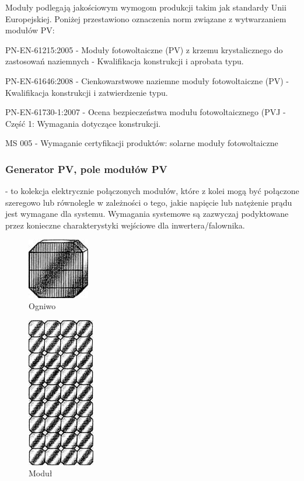 \documentclass[12pt,a4paper]{article}
\begin{document}
Moduły podlegają jakościowym wymogom produkcji takim jak standardy Unii 
Europejskiej. Poniżej przestawiono oznaczenia norm związane z wytwarzaniem modułów PV:  

PN-EN-61215:2005 - Moduły fotowoltaiczne (PV) z krzemu krystalicznego do 
zastosowań naziemnych - Kwalifikacja konstrukcji i aprobata typu. 

PN-EN-61646:2008 - Cienkowarstwowe naziemne moduły fotowoltaiczne (PV) - 
Kwalifikacja konstrukcji i zatwierdzenie typu. 

PN-EN-61730-1:2007 - Ocena bezpieczeństwa modułu fotowoltaicznego (PVJ - 
Część 1: Wymagania dotyczące konstrukcji. 

MS 005 - Wymaganie certyfikacji produktów: solarne moduły fotowoltaiczne 

\subsubsection{Generator PV, pole modułów PV} - to kolekcja elektrycznie 
połączonych modułów, które z kolei mogą być połączone szeregowo lub 
równolegle w zależności o tego, jakie napięcie lub natężenie prądu jest 
wymagane dla systemu. Wymagania systemowe są zazwyczaj podyktowane przez 
konieczne charakterystyki wejściowe dla inwertera/falownika. 

\begin{figure}[h]
\centering
\caption{Ogniwo}
\includegraphics[natwidth=2.72cm,natheight=2.65cm]{media/image6.jpg}
\end{figure}
\begin{figure}[h]
\centering
\caption{Moduł}
\includegraphics[natwidth=2.96cm,natheight=6.58cm]{media/image7.jpg}
\end{figure}
\end{document}
